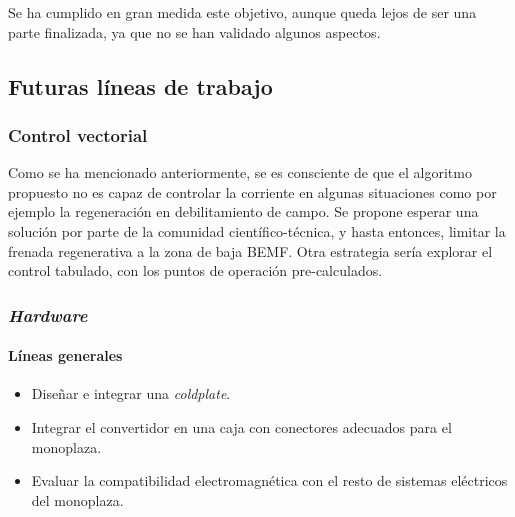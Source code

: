 Se ha cumplido en gran medida este objetivo, aunque queda lejos de ser una parte finalizada, ya que no se han validado algunos aspectos.

\subsection{Futuras líneas de trabajo}

\subsubsection{Control vectorial}

Como se ha mencionado anteriormente, se es consciente de que el algoritmo propuesto no es capaz de controlar la corriente en algunas situaciones como por ejemplo la regeneración en debilitamiento de campo. Se propone esperar una solución por parte de la comunidad científico-técnica, y hasta entonces, limitar la frenada regenerativa a la zona de baja BEMF. Otra estrategia sería explorar el control tabulado, con los puntos de operación pre-calculados.

\subsubsection{\textit{Hardware}}

\paragraph{Líneas generales}
\begin{itemize}
	\item Diseñar e integrar una \textit{coldplate}.
	\item Integrar el convertidor en una caja con conectores adecuados para el monoplaza.
	\item Evaluar la compatibilidad electromagnética con el resto de sistemas eléctricos del monoplaza.
\end{itemize}

